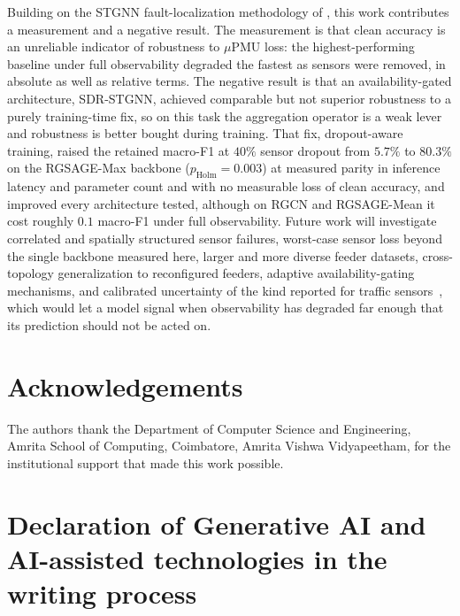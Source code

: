 \documentclass[3p,times,procedia]{elsarticle}
\begin{document}
Building on the STGNN fault-localization methodology of \cite{Karabulut2026}, this work contributes a measurement and a negative result. The measurement is that clean accuracy is an unreliable indicator of robustness to $\mu$PMU loss: the highest-performing baseline under full observability degraded the fastest as sensors were removed, in absolute as well as relative terms. The negative result is that an availability-gated architecture, SDR-STGNN, achieved comparable but not superior robustness to a purely training-time fix, so on this task the aggregation operator is a weak lever and robustness is better bought during training. That fix, dropout-aware training, raised the retained macro-F1 at $40\%$ sensor dropout from $5.7\%$ to $80.3\%$ on the RGSAGE-Max backbone ($p_{\text{Holm}}=0.003$) at measured parity in inference latency and parameter count and with no measurable loss of clean accuracy, and improved every architecture tested, although on RGCN and RGSAGE-Mean it cost roughly $0.1$ macro-F1 under full observability. Future work will investigate correlated and spatially structured sensor failures, worst-case sensor loss beyond the single backbone measured here, larger and more diverse feeder datasets, cross-topology generalization to reconfigured feeders, adaptive availability-gating mechanisms, and calibrated uncertainty of the kind reported for traffic sensors~\cite{kirthan2026}, which would let a model signal when observability has degraded far enough that its prediction should not be acted on.

\section*{Acknowledgements}

The authors thank the Department of Computer Science and Engineering, Amrita School of Computing, Coimbatore, Amrita Vishwa Vidyapeetham, for the institutional support that made this work possible.

\section*{Declaration of Generative AI and AI-assisted technologies in the writing process}
\end{document}
